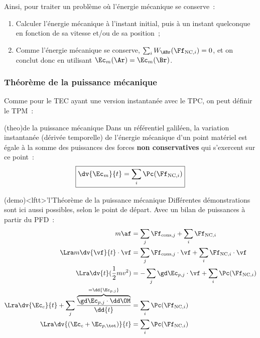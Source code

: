 \documentclass[../../main/main.tex]{subfiles}
\begin{document}
Ainsi, pour traiter un problème où l'énergie mécanique se conserve~:
\begin{enumerate}
	\item Calculer l'énergie mécanique à l'instant initial, puis à un instant
	      quelconque en fonction de sa vitesse et/ou de sa position~;
	\item Comme l'énergie mécanique se conserve, $\sum_i W_{\ABr}(\Ff_{{\rm
					      NC},i}) = 0$, et on conclut donc en utilisant $\Ec_m(\Ar) = \Ec_m(\Br)$.
\end{enumerate}

\subsubsection{Théorème de la puissance mécanique}

Comme pour le TEC ayant une version instantanée avec le TPC, on peut définir le
TPM~:

\begin{tcb*}(theo){de la puissance mécanique}
	Dans un référentiel galiléen, la variation instantanée (dérivée temporelle)
	de l’énergie mécanique d’un point matériel est égale à la somme des
	puissances des forces \textbf{non conservatives} qui s’exercent sur ce
	point~:
	\[\boxed{\dv{\Ec_m}{t} = \sum_i \Pc(\Ff_{{\rm NC},i})}\]
\end{tcb*}

\begin{tcb*}(demo)<lftt>'l'{Théorème de la puissance mécanique}
	Différentes démonstrations sont ici aussi possibles, selon le point de
	départ. Avec un bilan de puissances à partir du PFD~:
	\begin{align*}
		m\af                     & = \sum_j \Ff_{{\rm cons},j} + \sum_i \Ff_{{\rm NC},i}
		\\\Lra
		m \dv{\vf}{t}\cdot\vf    & = \sum_j \Ff_{{\rm cons},j}\cdot\vf
		+ \sum_i \Ff_{{\rm NC},i}\cdot\vf
		\\\Lra
		\dv{t}( \frac{1}{2}mv^2) & = -\sum_j \gd\Ec_{p,j}\cdot\vf
		+ \sum_i \Pc(\Ff_{{\rm NC},i})
		\\\Lra
		\dv{\Ec_c}{t} + \sum_j
		\frac{\overbrace{\gd\Ec_{p,j}\cdot\dd\OM}^{=\dd{\Ec_{p,j}}}}{\dd{t}}
		                         & = \sum_i \Pc(\Ff_{{\rm NC},i})
		\\\Lra
		\dv{(\Ec_c + \Ec_{p,\tot})}{t}
		                         & = \sum_i \Pc(\Ff_{{\rm NC},i})
	\end{align*}
\end{tcb*}
\end{document}
